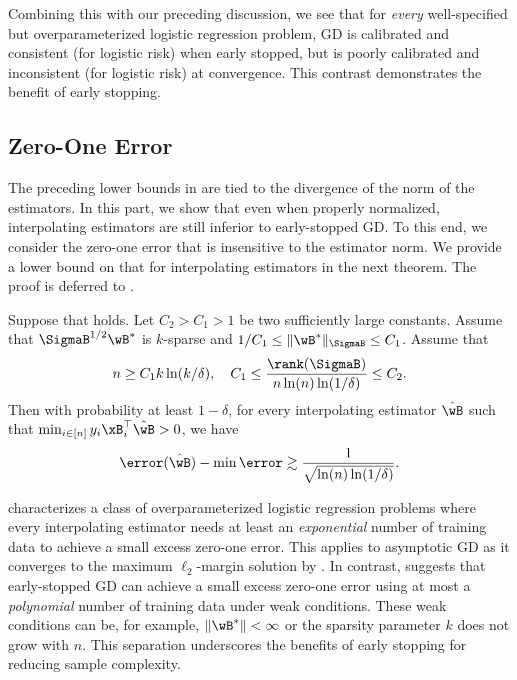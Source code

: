 \documentclass[11pt]{article}
\begin{document}
Combining this with our preceding discussion, we see that for \emph{every} well-specified but overparameterized logistic regression problem, GD is calibrated and consistent (for logistic risk) when early stopped, but is poorly calibrated and inconsistent  (for logistic risk) at convergence.
This contrast demonstrates the benefit of early stopping.




\subsection{Zero-One Error} 
The preceding lower bounds in  are tied to the divergence of the norm of the estimators. 
In this part, we show that even when properly normalized, interpolating estimators are still inferior to early-stopped GD. 
To this end, we consider the zero-one error that is insensitive to the estimator norm. We provide a lower bound on that for interpolating estimators in the next theorem. The proof is deferred to .

\begin{theorem}\label{thm:zero-one:lower-bound}
Suppose that  holds.
Let $C_2> C_1>1$ be two sufficiently large constants. 
Assume that $\SigmaB^{1/2}\wB^*$ is $k$-sparse and $1/C_1 \le \|\wB^*\|_{\SigmaB} \le C_1 $.
Assume that  
\begin{align*}
    n \ge C_1  k  \ln(k /\delta),\quad 
     C_1  \le \frac{\rank(\SigmaB) }{n \ln(n)\ln(1/\delta)}\le C_2 .
\end{align*} 
Then with probability at least $1-\delta$, for every interpolating estimator $\hat\wB$ such that $\min_{i\in[n]}y_i\xB_i^\top \hat\wB > 0$, we have
\begin{align*}
    \error(\hat \wB)-\min\error
    \gtrsim \frac{1}{\sqrt{\ln(n)\ln(1/\delta)}}.
\end{align*}
\end{theorem}

 characterizes a class of overparameterized logistic regression problems where every interpolating estimator needs at least an \emph{exponential} number of training data to achieve a small excess zero-one error. 
This applies to asymptotic GD as it converges to the maximum $\ell_2$-margin solution by .
In contrast,  suggests that early-stopped GD can achieve a small excess zero-one error using at most a \emph{polynomial} number of training data under weak conditions. These weak conditions can be, for example, $\|\wB^*\|<\infty$ or the sparsity parameter $k$ does not grow with $n$.
This separation underscores the benefits of early stopping for reducing sample complexity.
\end{document}
